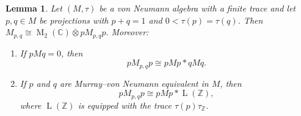 \documentclass[11pt]{amsart}
\numberwithin{equation}{section}
\newcommand{\zz}{\mathbb Z}
\newcommand{\cc}{\mathbb C}
\newcommand{\ovt}{\mathbin{\overline{\otimes}}}
\DeclareMathOperator{\LL}{L}
\newcommand{\rM}{\operatorname{M}}
\newtheorem{Lem}[The]{Lemma}
\theoremstyle{definition}
\begin{document}
\begin{Lem}
    \label{lem:equivalent-endpoints}
    Let $(M,\tau)$ be a von Neumann algebra with a finite trace and let $p,q\in M$ be projections with $p+q=1$ and $0<\tau(p)=\tau(q)$. Then $M_{p,q}\cong\rM_2(\cc)\ovt pM_{p,q}p.$ Moreover:
    \begin{enumerate}[\rm (i)]
        \item\label{it:separated-corners} If $pMq=0$, then
        $$
            pM_{p,q}p\cong pMp\ast qMq.
        $$
        \item\label{it:equivalent-corners} If $p$ and $q$ are Murray--von Neumann equivalent in $M$, then
        $$
            pM_{p,q}p\cong pMp\ast\LL(\zz),
        $$
        where $\LL(\zz)$ is equipped with the trace $\tau(p)\tau_\zz$.
    \end{enumerate}
\end{Lem}
\end{document}
